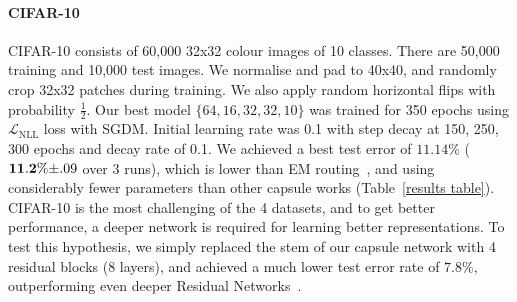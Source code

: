 \documentclass[letterpaper]{article} \usepackage{aaai20}  \usepackage{times}  \usepackage{helvet} \usepackage{courier}  \usepackage[hyphens]{url}  \usepackage{graphicx} \urlstyle{rm} \def\UrlFont{\rm}  \usepackage{graphicx}  \frenchspacing  \setlength{\pdfpagewidth}{8.5in}  \setlength{\pdfpageheight}{11in}  \nocopyright
\begin{document}
\paragraph{CIFAR-10}
CIFAR-10 consists of 60,000 32x32 colour images of 10 classes. There are 50,000 training and 10,000 test images. We normalise and pad to 40x40, and randomly crop 32x32 patches during training. We also apply random horizontal flips with probability $\frac{1}{2}$. Our best model $\{64, 16, 32, 32, 10\}$ was trained for 350 epochs using $\mathcal{L}_{\mathrm{NLL}}$ loss with SGDM. Initial learning rate was 0.1 with step decay at 150, 250, 300 epochs and decay rate of 0.1. We achieved a best test error of $\mathbf{11.14}$\% ($\mathbf{11.2}\%\scriptsize{\pm.09}$ over 3 runs), which is lower than EM routing~\cite{hinton2018matrix}, and using considerably fewer parameters than other capsule works (Table~\ref{results table}). CIFAR-10 is the most challenging of the 4 datasets, and to get better performance, a deeper network is required for learning better representations. To test this hypothesis, we simply replaced the stem of our capsule network with 4 residual blocks (8 layers), and achieved a much lower test error rate of $\mathbf{7.8}\%$, outperforming even deeper Residual Networks~\cite{he2016deep}.
\end{document}
